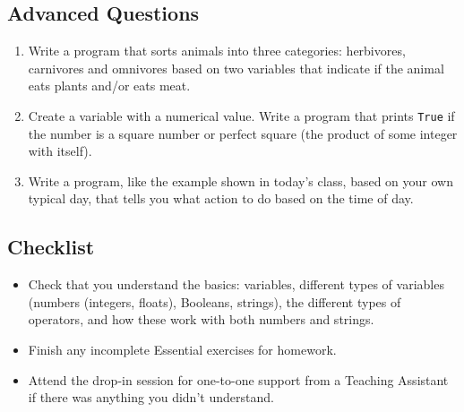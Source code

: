 \documentclass[12pt]{article}
\begin{document}
\subsection*{Advanced Questions}

\begin{enumerate}[label=(\Alph*)]

    \item Write a program that sorts animals into three categories: herbivores, carnivores and omnivores based on two variables that indicate if the animal eats plants and/or eats meat.
    
    \item Create a variable with a numerical value. Write a program that prints {\tt True} if the number is a square number or perfect square (the product of some integer with itself).
    
    
    \item Write a program, like the example shown in today's class, based on your own typical day, that tells you what action to do based on the time of day.   
    
\end{enumerate}





\subsection*{Checklist}
\begin{itemize}
	\item Check that you understand the basics: variables, different types of variables (numbers (integers, floats), Booleans, strings), the different types of operators, and how these work with both numbers and strings.
	\item Finish any incomplete Essential exercises for homework. 
	\item Attend the drop-in session for one-to-one support from a Teaching Assistant if there was anything you didn't understand.
\end{itemize}
\end{document}
